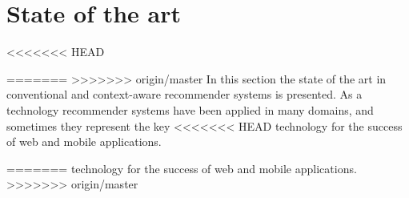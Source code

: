 \chapter{State of the art} \label{stateoftheart}
<<<<<<< HEAD

=======
>>>>>>> origin/master
In this section the state of the art in conventional and
context-aware recommender systems is presented. 
As a technology recommender systems have been applied 
in many domains, and sometimes they represent the  key
<<<<<<< HEAD
technology for the success of web and mobile applications.

=======
technology for the success of web and mobile applications.\\  
% 
>>>>>>> origin/master
